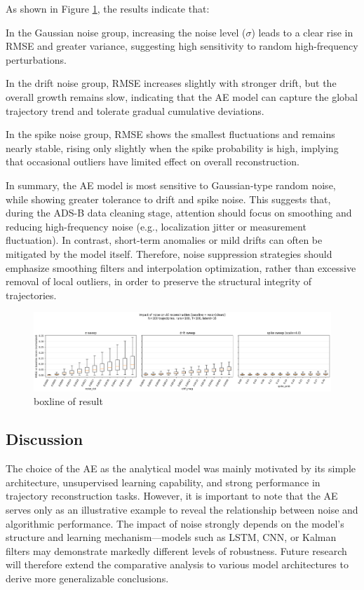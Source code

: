 As shown in Figure \ref{fig:impactofnoise}, the results indicate that:

In the Gaussian noise group, increasing the noise level ($\sigma$) leads to a clear rise in RMSE and greater variance, suggesting high sensitivity to random high-frequency perturbations.

In the drift noise group, RMSE increases slightly with stronger drift, but the overall growth remains slow, indicating that the AE model can capture the global trajectory trend and tolerate gradual cumulative deviations.

In the spike noise group, RMSE shows the smallest fluctuations and remains nearly stable, rising only slightly when the spike probability is high, implying that occasional outliers have limited effect on overall reconstruction.

In summary, the AE model is most sensitive to Gaussian-type random noise, while showing greater tolerance to drift and spike noise. This suggests that, during the ADS-B data cleaning stage, attention should focus on smoothing and reducing high-frequency noise (e.g., localization jitter or measurement fluctuation). In contrast, short-term anomalies or mild drifts can often be mitigated by the model itself. Therefore, noise suppression strategies should emphasize smoothing filters and interpolation optimization, rather than excessive removal of local outliers, in order to preserve the structural integrity of trajectories.

\begin{figure}
	\centering
	\includegraphics[width=1\linewidth]{impact_of_noise}
	\caption{boxline of result}
	\label{fig:impactofnoise}
\end{figure}

\subsection{Discussion}
The choice of the AE as the analytical model was mainly motivated by its simple architecture, unsupervised learning capability, and strong performance in trajectory reconstruction tasks. However, it is important to note that the AE serves only as an illustrative example to reveal the relationship between noise and algorithmic performance. The impact of noise strongly depends on the model’s structure and learning mechanism—models such as LSTM, CNN, or Kalman filters may demonstrate markedly different levels of robustness. Future research will therefore extend the comparative analysis to various model architectures to derive more generalizable conclusions.

